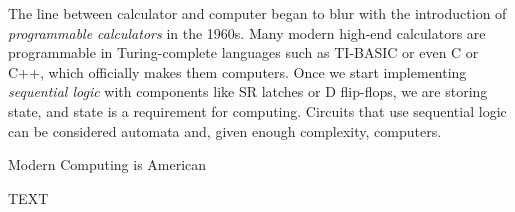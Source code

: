 
The line between calculator and computer began to blur with the introduction of \textit{programmable calculators} in the 1960s. Many modern high-end calculators are programmable in Turing-complete languages such as TI-BASIC or even C or C++, which officially makes them computers. Once we start implementing \textit{sequential logic} with components like SR latches or D flip-flops, we are storing state, and state is a requirement for computing. Circuits that use sequential logic can be considered automata and, given enough complexity, computers.

\begin{bluebox}{Modern Computing is American}

    TEXT

\end{bluebox}

